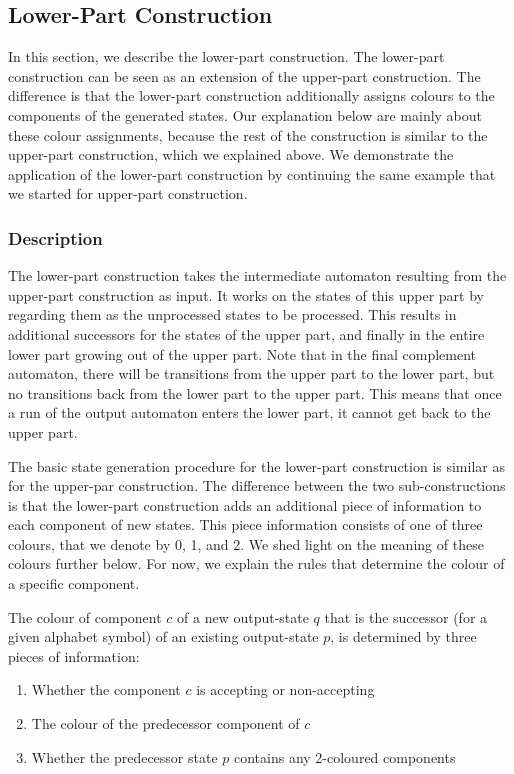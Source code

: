 \subsection{Lower-Part Construction}
\label{3_lower_part}
In this section, we describe the lower-part construction. The lower-part construction can be seen as an extension of the upper-part construction. The difference is that the lower-part construction additionally assigns colours to the components of the generated states. Our explanation below are mainly about these colour assignments, because the rest of the construction is similar to the upper-part construction, which we explained above. We demonstrate the application of the lower-part construction by continuing the same example that we started for upper-part construction.

\subsubsection{Description}
The lower-part construction takes the intermediate automaton resulting from the upper-part construction as input. It works on the states of this upper part by regarding them as the unprocessed states to be processed. This results in additional successors for the states of the upper part, and finally in the entire lower part growing out of the upper part. Note that in the final complement automaton, there will be transitions from the upper part to the lower part, but no transitions back from the lower part to the upper part. This means that once a run of the output automaton enters the lower part, it cannot get back to the upper part.

The basic state generation procedure for the lower-part construction is similar as for the upper-par construction. The difference between the two sub-constructions is that the lower-part construction adds an additional piece of information to each component of new states. This piece information consists of one of three colours, that we denote by 0, 1, and 2. We shed light on the meaning of these colours further below. For now, we explain the rules that determine the colour of a specific component.

The colour of component $c$ of a new output-state $q$ that is the successor (for a given alphabet symbol) of an existing output-state $p$, is determined by three pieces of information:

\begin{enumerate}
\item Whether the component $c$ is accepting or non-accepting
\item The colour of the predecessor component of $c$ 
\item Whether the predecessor state $p$ contains any 2-coloured components
\end{enumerate}

